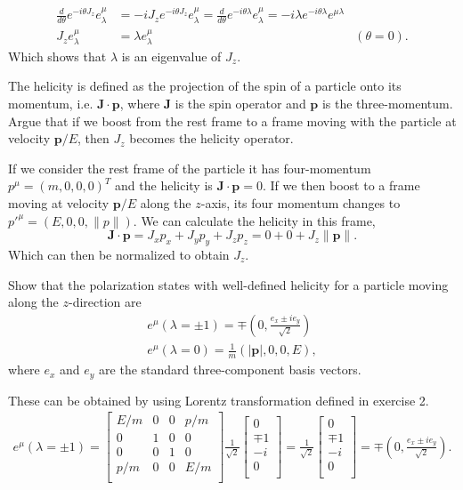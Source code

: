 \documentclass[working, oneside]{../../../Preambles/tuftebook}
\begin{document}
\begin{align*}
    \frac{d}{d\theta } e^{-i\theta J_z}e^{\mu }_{\lambda} &= -iJ_ze^{-i\theta J_z} e^{\mu }_{\lambda}=
    \frac{d}{d\theta } e^{-i\theta \lambda}e^{\mu }_{\lambda} = -i\lambda e^{-i\theta \lambda} e^{\mu \lambda} \\
    J_z e^{\mu }_{\lambda} &= \lambda e^{\mu }_{\lambda} &(\theta =0)
.\end{align*}
Which shows that $\lambda$ is an eigenvalue of $J_z$.
\begin{exercise}[5]
The helicity is defined as the projection of the spin of a particle onto its
momentum, i.e. $\bm J\cdot \bm p$, where $\bm J$ is the spin operator and $\bm p$ is the 
three-momentum. Argue that if we boost from the rest frame to a frame moving with the 
particle at velocity $\bm p/E$, then $J_z$ becomes the helicity operator. 
\end{exercise}
If we consider the rest frame of the particle it has four-momentum $p^{\mu } = \left( m,0,0,0 \right) ^{T}$ and the helicity is $\mathbf{J}\cdot  \mathbf{p}=0$. If we then boost to a frame moving at velocity $\mathbf{p} /E$ along the $z$-axis, its four momentum changes to $p'^{\mu } = \left( E, 0,0, \|p\| \right) $. We can calculate the helicity in this frame,
\[
\mathbf{J}\cdot \mathbf{p} = J_xp_x + J_y p_y + J_zp_z = 0+0+J_z\|\mathbf{p}\|
.\] 
Which can then be normalized to obtain $J_z$.
\begin{exercise}[6]
Show that the polarization states with well-defined helicity for a particle
moving along the $z$-direction are 
\begin{align}
&e^{\mu}(\lambda=\pm 1)=\mp\left(0,\frac{e_x\pm i e_y}{\sqrt{2}}\right)&\\
&e^{\mu}(\lambda=0)=\frac{1}{m}\left(|\bm p|,0,0,E\right),&
\end{align}
where $e_x$ and $e_y$ are the standard three-component basis vectors.
\end{exercise}
These can be obtained by using Lorentz transformation defined in exercise 2.
\begin{align*}
    e^{\mu }\left( \lambda = \pm 1 \right) = 
\begin{bmatrix}
    E /m & 0 & 0 & p /m \\
    0 & 1 & 0 & 0 \\
    0 & 0 & 1 & 0 \\
    p /m & 0 & 0& E /m \\
\end{bmatrix}
\frac{1}{\sqrt{2} }
\begin{bmatrix}
    0 \\
    \mp 1 \\
    -i \\
    0 \\
\end{bmatrix}
= 
\frac{1}{\sqrt{2} }
\begin{bmatrix}
    0 \\
    \mp 1 \\
    -i \\
    0 \\
\end{bmatrix}
= \mp \left( 0, \frac{e_x \pm ie_y}{\sqrt{2} } \right) 
.\end{align*}
\end{document}
